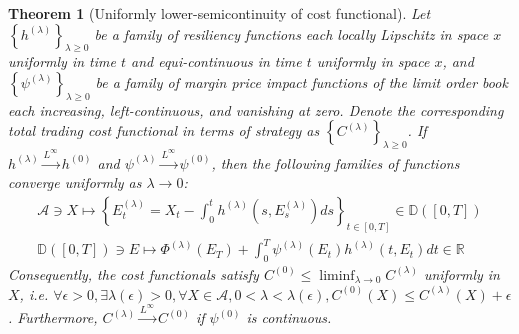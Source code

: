 \documentclass[openany,oneside]{article}
\newtheorem{thm}{Theorem}[section]
\theoremstyle{definition}
\theoremstyle{remark}
\begin{document}
\begin{thm}[Uniformly lower-semicontinuity of cost functional]
Let $\left\{h^{(\lambda)}\right\}_{\lambda\ge 0}$ be a family of resiliency functions each locally Lipschitz in space $x$ uniformly in time $t$ and equi-continuous in time $t$ uniformly in space $x$, and $\left\{\psi^{(\lambda)}\right\}_{\lambda\ge 0}$ be a family of margin price impact functions of the limit order book each increasing, left-continuous, and vanishing at zero. Denote the corresponding total trading cost functional in terms of strategy as $\left\{C^{(\lambda)}\right\}_{\lambda\ge 0}$. If $h^{(\lambda)} \xrightarrow{L^\infty} h^{(0)}$ and $\psi^{(\lambda)} \xrightarrow{L^\infty} \psi^{(0)}$, then the following families of functions converge uniformly as $\lambda \to 0$:
\begin{align*}
\mathcal{A} \ni X \mapsto \left\{ E^{(\lambda)}_t = X_t - \int_0^t h^{(\lambda)}\left(s,E^{(\lambda)}_s\right) ds \right\}_{t\in[0,T]} \in \mathbb{D}([0,T]) \\
\mathbb{D}([0,T]) \ni E \mapsto \Phi^{(\lambda)}(E_T) + \int_0^T \psi^{(\lambda)}(E_t) h^{(\lambda)}(t,E_t) dt \in \mathbb{R}
\end{align*}
Consequently, the cost functionals satisfy $C^{(0)} \le \liminf_{\lambda\to 0} C^{(\lambda)}$ uniformly in $X$, i.e. $\forall \epsilon>0, \exists \lambda(\epsilon)>0, \forall X\in\mathcal{A}, 0<\lambda<\lambda(\epsilon), C^{(0)}(X) \le C^{(\lambda)}(X)+\epsilon$. Furthermore, $C^{(\lambda)} \xrightarrow{L^\infty} C^{(0)}$ if $\psi^{(0)}$ is continuous.
\end{thm}
\end{document}
